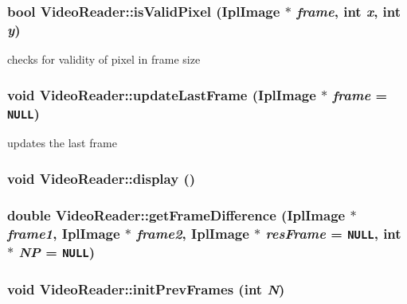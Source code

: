 \subsubsection{\setlength{\rightskip}{0pt plus 5cm}bool VideoReader::isValidPixel (IplImage $\ast$ {\em frame}, int {\em x}, int {\em y})\hspace{0.3cm}{\tt  [inline]}}\label{classVideoReader_c905f0c4bc9325bf319d746ebcdd8ce7}


checks for validity of pixel in frame size 

\subsubsection{\setlength{\rightskip}{0pt plus 5cm}void VideoReader::updateLastFrame (IplImage $\ast$ {\em frame} = {\tt NULL})}\label{classVideoReader_f89a1037188cb805123b56ff56bed90f}


updates the last frame 

\subsubsection{\setlength{\rightskip}{0pt plus 5cm}void VideoReader::display ()}\label{classVideoReader_fc9f0afccdb05c79391718c7f9cce7a2}


\subsubsection{\setlength{\rightskip}{0pt plus 5cm}double VideoReader::getFrameDifference (IplImage $\ast$ {\em frame1}, IplImage $\ast$ {\em frame2}, IplImage $\ast$ {\em resFrame} = {\tt NULL}, int $\ast$ {\em NP} = {\tt NULL})}\label{classVideoReader_08d89437b44ac917fa389a7f1b865f81}


\subsubsection{\setlength{\rightskip}{0pt plus 5cm}void VideoReader::initPrevFrames (int {\em N})}\label{classVideoReader_63c948f1bdafb9aa1440b65f41f43199}


